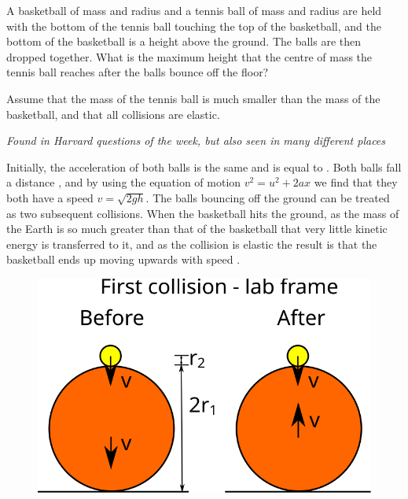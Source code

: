 
\begin{problem}[Superball] 
{A basketball of mass  and radius   and a tennis ball of  mass  and radius  are held with the bottom of the tennis ball touching the top of the basketball, and the bottom of the basketball is a height  above the ground. The balls are then dropped together. What is the maximum height that the centre of mass the tennis ball reaches after the balls bounce off the floor?

Assume that the mass of the tennis ball is much smaller than the mass of the basketball, and that all collisions are elastic.
}
{\textit{Found in Harvard questions of the week, but also seen in many different places}}
{Initially, the acceleration of both balls is the same and is equal to . Both balls fall a distance  , and by using the equation of motion $v^2 = u^2 + 2ax$ we find that they both have a speed $v = \sqrt{2gh}$. The balls bouncing off the ground can be treated as two subsequent collisions. When the basketball hits the ground, as the mass of the Earth is so much greater than that of the basketball that very little kinetic energy is transferred to it, and as the collision is elastic the result is that the basketball ends up moving upwards with speed .

\begin{figure}[h]
\centering
\includegraphics[scale =1]{../../../figures/dynamics_tennis_basket_ball_first.svg}
\caption{}
\label{fig:dynamics_tennis_basket_first}
\end{figure}

}
\end{problem}
